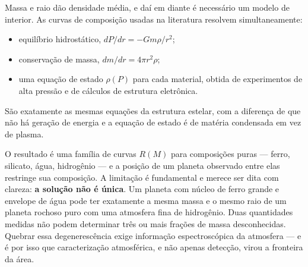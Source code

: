 \documentclass[11pt,a4paper]{article}
\begin{document}
Massa e raio dão densidade média, e daí em diante é necessário um modelo de interior. As curvas de composição usadas na literatura resolvem simultaneamente:
\begin{itemize}
\item equilíbrio hidrostático, $dP/dr=-Gm\rho/r^{2}$;
\item conservação de massa, $dm/dr=4\pi r^{2}\rho$;
\item uma equação de estado $\rho(P)$ para cada material, obtida de experimentos de alta pressão e de cálculos de estrutura eletrônica.
\end{itemize}
São exatamente as mesmas equações da estrutura estelar, com a diferença de que não há geração de energia e a equação de estado é de matéria condensada em vez de plasma.

O resultado é uma família de curvas $R(M)$ para composições puras --- ferro, silicato, água, hidrogênio --- e a posição de um planeta observado entre elas restringe sua composição. A limitação é fundamental e merece ser dita com clareza: \textbf{a solução não é única}. Um planeta com núcleo de ferro grande e envelope de água pode ter exatamente a mesma massa e o mesmo raio de um planeta rochoso puro com uma atmosfera fina de hidrogênio. Duas quantidades medidas não podem determinar três ou mais frações de massa desconhecidas. Quebrar essa degenerescência exige informação espectroscópica da atmosfera --- e é por isso que caracterização atmosférica, e não apenas detecção, virou a fronteira da área.
\end{document}
